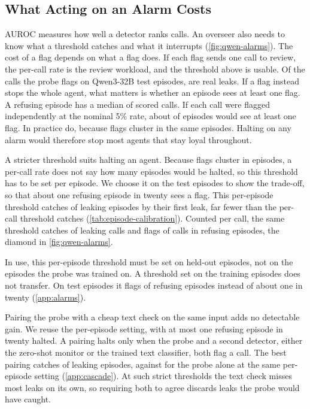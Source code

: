 \documentclass[letterpaper]{article} %
\begin{document}
\subsection{What Acting on an Alarm Costs}
\label{sec:cost}

AUROC measures how well a detector ranks calls.
An overseer also needs to know what a threshold catches and what it interrupts (\cref{fig:qwen-alarms}).
The cost of a flag depends on what a flag does.
If each flag sends one call to review, the per-call rate is the review workload, and the threshold above is usable.
Of the calls the probe flags on Qwen3-32B test episodes, \qwenFreshProbePrecision{} are real leaks.
If a flag instead stops the whole agent, what matters is whether an episode sees at least one flag.
A refusing episode has a median of \qwenFreshMedianRefusingCalls{} scored calls.
If each call were flagged independently at the nominal 5\% rate, about \qwenEpisodeAlarmIndependent{} of episodes would see at least one flag.
In practice \qwenFreshRefusingEpisodeAlarm{} do, because flags cluster in the same episodes.
Halting on any alarm would therefore stop most agents that stay loyal throughout.

A stricter threshold suits halting an agent.
Because flags cluster in episodes, a per-call rate does not say how many episodes would be halted, so this threshold has to be set per episode.
We choose it on the test episodes to show the trade-off, so that about one refusing episode in twenty sees a flag.
This per-episode threshold catches \qwenEpisodeCalCaught{} of leaking episodes by their first leak, far fewer than the per-call threshold catches (\cref{tab:episode-calibration}).
Counted per call, the same threshold catches \qwenCalibrationEpisodeLeakCallsRateRounded{} of leaking calls and flags \qwenCalibrationEpisodeRefusingCallsRate{} of calls in refusing episodes, the diamond in \cref{fig:qwen-alarms}.

In use, this per-episode threshold must be set on held-out episodes, not on the episodes the probe was trained on.
A threshold set on the training episodes does not transfer.
On test episodes it flags \qwenEpisodeCalTrainRefusingEpisodes{} of refusing episodes instead of about one in twenty (\cref{app:alarms}).

Pairing the probe with a cheap text check on the same input adds no detectable gain.
We reuse the per-episode setting, with at most one refusing episode in twenty halted.
A pairing halts only when the probe and a second detector, either the zero-shot monitor or the trained text classifier, both flag a call.
The best pairing catches \cascadeBowGridFiveCaught{} of \qwenCalibrationEpisodeLeakEpisodesDenominator{} leaking episodes, against \cascadeProbeAloneFiveCaught{} for the probe alone at the same per-episode setting (\cref{app:cascade}).
At such strict thresholds the text check misses most leaks on its own, so requiring both to agree discards leaks the probe would have caught.
\end{document}
